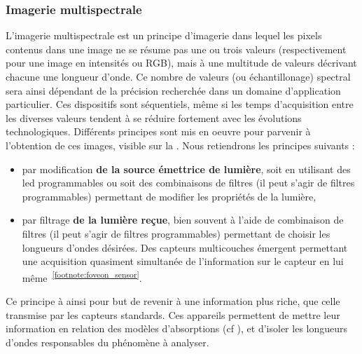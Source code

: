 \subsubsection{Imagerie multispectrale}
L'imagerie multispectrale est un principe d'imagerie dans lequel les pixels contenus dans une image ne se résume pas une ou trois valeurs (respectivement pour une image en intensités ou RGB), mais à une multitude de valeurs décrivant chacune une longueur d'onde. Ce nombre de valeurs (ou échantillonage) spectral sera ainsi dépendant de la précision recherchée dans un domaine d'application particulier. Ces dispositifs sont séquentiels, même si les temps d'acquisition entre les diverses valeurs tendent à se réduire fortement avec les évolutions technologiques. Différents principes sont mis en oeuvre pour parvenir à l'obtention de ces images, visible sur la . Nous retiendrons les principes suivants :
\begin{itemize}
\item par modification \textbf{de la source émettrice de lumière}, soit en utilisant des \gls{led} programmables ou soit des combinaisons de filtres (il peut s'agir de filtres programmables) permettant de modifier les propriétés de la lumière,
\item par filtrage \textbf{de la lumière reçue}, bien souvent à l'aide de combinaison de filtres (il peut s'agir de filtres programmables) permettant de choisir les longueurs d'ondes désirées. Des capteurs multicouches émergent permettant une acquisition quasiment simultanée de l'information sur le capteur en lui même~\textsuperscript{\ref{footnote:foveon_sensor}}.
\end{itemize}\par

Ce principe à ainsi pour but de revenir à une information plus riche, que celle transmise par les capteurs standards. Ces appareils permettent de mettre leur information en relation des modèles d'absorptions (cf ), et d'isoler les longueurs d'ondes responsables du phénomène à analyser.\par 

\addtocounter{footnote}{1}

